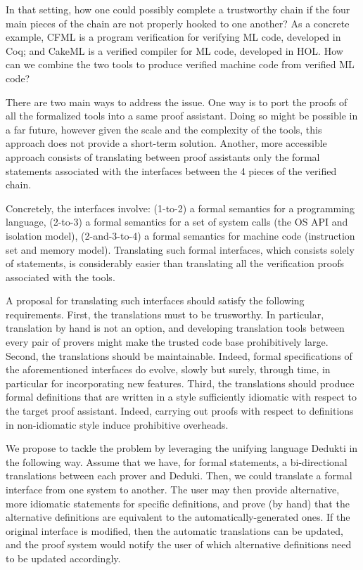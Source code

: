 \begin{workpackage}[id=libraries,wphases=0-48,type=RTD,
  short=Libraries,%
  title=Libraries,
  lead=Inr,
  InrRM=10]
In that setting, how one could possibly complete a trustworthy chain if
the four main pieces of the chain are not properly hooked to one another?
As a concrete example, CFML is a program verification for verifying ML code,
developed in Coq; and CakeML is a verified compiler for ML code,
developed in HOL. How can we combine the two tools to produce verified
machine code from verified ML code?

There are two main ways to address the issue. One way is to port the
proofs of all the formalized tools into a same proof assistant.
Doing so might be possible in a far future, however given the scale and
the complexity of the tools, this approach does not provide a short-term
solution. Another, more accessible approach consists of translating
between proof assistants only the formal statements associated with the
interfaces between the 4 pieces of the verified chain.

Concretely, the interfaces involve: (1-to-2) a formal semantics for
a programming language, (2-to-3) a formal semantics for a set of
system calls (the OS API and isolation model), (2-and-3-to-4) a formal
semantics for machine code (instruction set and memory model).
Translating such formal interfaces, which consists solely of statements,
is considerably easier than translating all the verification proofs
associated with the tools.

A proposal for translating such interfaces should satisfy the following
requirements. First, the translations must to be trusworthy. In particular,
translation by hand is not an option, and developing translation tools
between every pair of provers might make the trusted code base prohibitively
large. Second, the translations should be maintainable. Indeed,
formal specifications of the aforementioned interfaces do evolve, slowly but
surely, through time, in particular for incorporating new features.
Third, the translations should produce formal definitions that are written
in a style sufficiently idiomatic with respect to the target proof assistant.
Indeed, carrying out proofs with respect to definitions in non-idiomatic
style induce prohibitive overheads.

We propose to tackle the problem by leveraging the unifying language
Dedukti in the following way. Assume that we have, for formal statements,
a bi-directional translations between each prover and Deduki. Then,
we could translate a formal interface from one system to another.
The user may then provide alternative, more idiomatic statements for
specific definitions, and prove (by hand) that the alternative definitions
are equivalent to the automatically-generated ones. If the original
interface is modified, then the automatic translations can be updated,
and the proof system would notify the user of which alternative definitions
need to be updated accordingly.


\end{workpackage}
